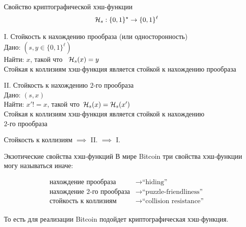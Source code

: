 \documentclass[usenames,dvipsnames,8pt,aspectratio=169]{beamer}
\begin{document}
\begin{frame}{Свойство криптографической хэш-функции}
\Large 
\[
\mathcal{H}_s: \{0,1\}^\star \rightarrow \{0,1\}^\ell
\]

	{\color{Orange} I.} Стойкость к нахождению прообраза (или односторонность) \\[5pt]
	Дано: $(s, y \in \{0,1\}^\ell)$\\
	Найти: $x$, такой что \ $\mathcal{H}_s(x) =  y$ \\[5pt]
	{\color{Orange} Стойкая к коллизиям хэш-функция является стойкой к нахождению прообраза}
	

	\vspace{20pt}
	{\color{Orange} II.} Стойкость к нахождению $2$-го прообраза \\[5pt]
	Дано: $(s, x)$\\
	Найти: $x'!=x$, такой что\ $\mathcal{H}_s(x) =  \mathcal{H}_s(x')$ \\[5pt]
	{\color{Orange}  Стойкая к коллизиям хэш-функция является стойкой к нахождению \\ $2$-го прообраза}
	
	\vspace{20pt}
	
	Стойкость к коллизиям  $\implies$ 	{\color{Orange} II.}  $\implies$ 	{\color{Orange} I.}  
\end{frame}

\begin{frame}{Экзотические свойства хэш-функций}
	\LARGE
	В мире Bitcoin три свойства хэш-функции могу называться иначе:
	
	\begin{align*}
		\text{нахождение прообраза} & \rightarrow  \text{``hiding''} \\
		\text{нахождение 2-го прообраза} & \rightarrow  \text{``puzzle-friendliness''} \\
		\text{стойкость к коллизиям} & \rightarrow  \text{``collision resistance''} \\
	\end{align*}
	 
	
	То есть для реализации Bitcoin подойдет криптографическая хэш-функция.

\end{frame}
\end{document}
